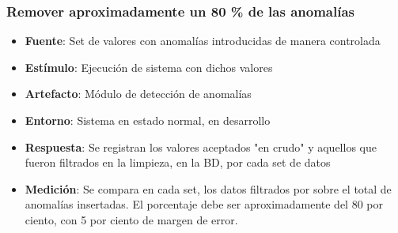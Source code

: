 \subsubsection{Remover aproximadamente un 80 \% de las anomalías}
\begin{itemize}
\item {\bf Fuente}: Set de valores con anomalías introducidas de manera controlada
\item {\bf Estímulo}: Ejecución de sistema con dichos valores
\item {\bf Artefacto}: Módulo de detección de anomalías
\item {\bf Entorno}: Sistema en estado normal, en desarrollo
\item {\bf Respuesta}: Se registran los valores aceptados "en crudo" y aquellos que fueron filtrados en la limpieza, en la BD, por cada set de datos
\item {\bf Medición}: Se compara en cada set, los datos filtrados por sobre el total de anomalías insertadas. El porcentaje debe ser aproximadamente del 80 por ciento, con 5 por ciento de margen de error.
\end{itemize}